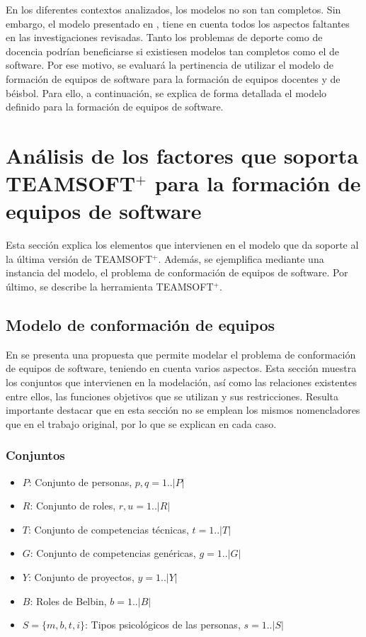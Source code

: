 En los diferentes contextos analizados, los modelos no son tan completos. Sin embargo, el modelo presentado en \cite{Duran2019}, tiene en cuenta todos los aspectos faltantes en las investigaciones revisadas. Tanto los problemas de deporte como de docencia podrían beneficiarse si existiesen modelos tan completos como el de software. Por ese motivo, se evaluará la pertinencia de utilizar el modelo de formación de equipos de software para la formación de equipos docentes y de béisbol. Para ello, a continuación, se explica de forma detallada el modelo definido para la formación de equipos de software.

\section{Análisis de los factores que soporta TEAMSOFT$^+$ para la formación de equipos de software}

Esta sección explica los elementos que intervienen en el modelo que da soporte al la última versión de TEAMSOFT$^+$. Además, se ejemplifica mediante una instancia del modelo, el problema de conformación de equipos de software. Por último, se describe la herramienta TEAMSOFT$^+$.

\subsection{Modelo de conformación de equipos} \label{sec:modelo-teamsoft}

En \cite{Duran2019} se presenta una propuesta que permite modelar el problema de conformación de equipos de software, teniendo en cuenta varios aspectos. Esta sección muestra los conjuntos que intervienen en la modelación, así como las relaciones existentes entre ellos, las funciones objetivos que se utilizan y sus restricciones. Resulta importante destacar que en esta sección no se emplean los mismos nomencladores que en el trabajo original, por lo que se explican en cada caso.

\subsubsection{Conjuntos} \label{entidades}

\begin{itemize}
  \item $P$: Conjunto de personas, $p, q= 1.. |P|$
  \item $R$: Conjunto de roles, $r,u= 1.. |R|$
  \item $T$: Conjunto de competencias técnicas, $t= 1.. |T|$
  \item $G$: Conjunto de competencias genéricas, $g= 1.. |G|$
  \item $Y$: Conjunto de proyectos, $y= 1.. |Y|$
  \item $B$: Roles de Belbin, $b= 1.. |B|$
  \item $S= \{m,b,t,i\}$: Tipos psicológicos de las personas, $s= 1.. |S| $
\end{itemize}

